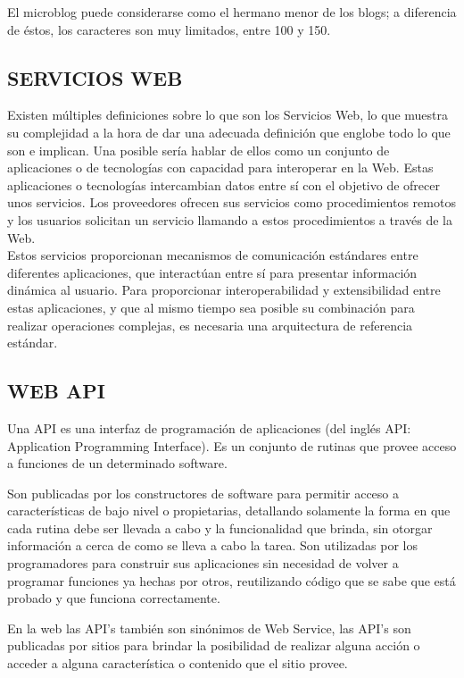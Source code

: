 El microblog puede considerarse como el hermano menor de los blogs; a diferencia de éstos, los caracteres son muy limitados, entre 100 y 150. 


\subsection{SERVICIOS WEB}

Existen múltiples definiciones sobre lo que son los Servicios Web, lo que muestra su complejidad a la hora de dar una adecuada definición que englobe todo lo que son e implican. Una posible sería hablar de ellos como un conjunto de aplicaciones o de tecnologías con capacidad para interoperar en la Web. Estas aplicaciones o tecnologías intercambian datos entre sí con el objetivo de ofrecer unos servicios. Los proveedores ofrecen sus servicios como procedimientos remotos y los usuarios solicitan un servicio llamando a estos procedimientos a través de la Web.\\

Estos servicios proporcionan mecanismos de comunicación estándares entre diferentes aplicaciones, que interactúan entre sí para presentar información dinámica al usuario. Para proporcionar interoperabilidad y extensibilidad entre estas aplicaciones, y que al mismo tiempo sea posible su combinación para realizar operaciones complejas, es necesaria una arquitectura de referencia estándar.\\


\subsection{WEB API}
Una API es una interfaz de programación de aplicaciones (del inglés API: Application Programming Interface). Es un conjunto de rutinas que provee acceso a funciones de un determinado software.

Son publicadas por los constructores de software para permitir acceso a características de bajo nivel o propietarias, detallando solamente la forma en que cada rutina debe ser llevada a cabo y la funcionalidad que brinda, sin otorgar información a cerca de como se lleva a cabo la tarea. Son utilizadas por los programadores para construir sus aplicaciones sin necesidad de volver a programar funciones ya hechas por otros, reutilizando código que se sabe que está probado y que funciona correctamente.

En la web las API's también son sinónimos de Web Service, las API's son publicadas por sitios para brindar la posibilidad de realizar alguna acción o acceder a alguna característica o contenido que el sitio provee. 

